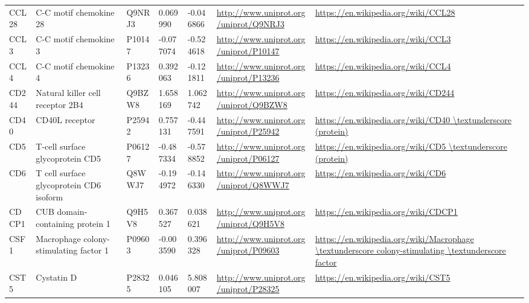 \begin{table}[H]
\begin{tabular}{ lllllll }
        \multicolumn{1}{l|}{ CCL28 } &  C-C motif chemokine 28   & Q9NRJ3   & 0.069990   & -0.046866   & \url{http://www.uniprot.org/uniprot/Q9NRJ3}   & \url{https://en.wikipedia.org/wiki/CCL28}          \\ 
        \multicolumn{1}{l|}{ CCL3 } &  C-C motif chemokine 3   & P10147   & -0.077074   & -0.524618   & \url{http://www.uniprot.org/uniprot/P10147}   & \url{https://en.wikipedia.org/wiki/CCL3}          \\ 
        \multicolumn{1}{l|}{ CCL4 } &  C-C motif chemokine 4   & P13236   & 0.392063   & -0.121811   & \url{http://www.uniprot.org/uniprot/P13236}   & \url{https://en.wikipedia.org/wiki/CCL4}          \\ 
        \multicolumn{1}{l|}{ CD244 } &  Natural killer cell receptor 2B4   & Q9BZW8   & 1.658169   & 1.062742   & \url{http://www.uniprot.org/uniprot/Q9BZW8}   & \url{https://en.wikipedia.org/wiki/CD244}          \\ 
        \multicolumn{1}{l|}{ CD40 } &  CD40L receptor   & P25942   & 0.757131   & -0.447591   & \url{http://www.uniprot.org/uniprot/P25942}   & \url{https://en.wikipedia.org/wiki/CD40 \textunderscore (protein)}          \\ 
        \multicolumn{1}{l|}{ CD5 } &  T-cell surface glycoprotein CD5   & P06127   & -0.487334   & -0.578852   & \url{http://www.uniprot.org/uniprot/P06127}   & \url{https://en.wikipedia.org/wiki/CD5 \textunderscore (protein)}          \\ 
        \multicolumn{1}{l|}{ CD6 } &  T cell surface glycoprotein CD6 isoform   & Q8WWJ7   & -0.194972   & -0.146330   & \url{http://www.uniprot.org/uniprot/Q8WWJ7}   & \url{https://en.wikipedia.org/wiki/CD6}          \\ 
        \multicolumn{1}{l|}{ CDCP1 } &  CUB domain-containing protein 1   & Q9H5V8   & 0.367527   & 0.038621   & \url{http://www.uniprot.org/uniprot/Q9H5V8}   & \url{https://en.wikipedia.org/wiki/CDCP1}          \\ 
        \multicolumn{1}{l|}{ CSF1 } &  Macrophage colony-stimulating factor 1   & P09603   & -0.003590   & 0.396328   & \url{http://www.uniprot.org/uniprot/P09603}   & \url{https://en.wikipedia.org/wiki/Macrophage \textunderscore colony-stimulating \textunderscore factor}          \\ 
        \multicolumn{1}{l|}{ CST5 } &  Cystatin D   & P28325   & 0.046105   & 5.808007   & \url{http://www.uniprot.org/uniprot/P28325}   & \url{https://en.wikipedia.org/wiki/CST5}          \\ 

\end{tabular}
\end{table}
